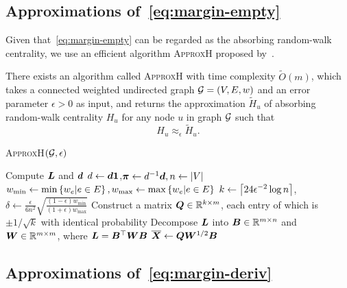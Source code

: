 \documentclass[sigconf]{acmart}
\begin{document}
\subsection{Approximations of~\eqref{eq:margin-empty}}\label{subsec:approx-margin-empty}

Given that~\eqref{eq:margin-empty} can be regarded as the absorbing random-walk centrality, we use an efficient algorithm \textsc{ApproxH} proposed by~\cite{ZhXuZh20}.
\begin{lemma}\label{lem:approxhk}
    There exists an algorithm called \textsc{ApproxH} with time complexity \(\tilde{O}(m)\), which takes a connected weighted undirected graph \(\mathcal{G}=(V,E,w)\) and an error parameter \(\epsilon>0\) as input, and returns the approximation \(\tilde{H}_u\) of absorbing random-walk centrality \(H_u\) for any node \(u\) in graph \(\mathcal{G}\) such that
    \[H_u\approx_\epsilon\tilde{H}_u.\]
\end{lemma}

\begin{algorithm}
    \caption{\textsc{ApproxH}\((\mathcal{G},\epsilon)\)}
    \label{algo:approxh}
    Compute \(\boldsymbol{L}\) and \(\boldsymbol{d}\)\;
    \(d\gets\boldsymbol{d}\boldsymbol{1}\),\(\boldsymbol{\pi}\gets d^{-1}\boldsymbol{d},n\gets\left|V \right|\)\;
    \(w_{\min}\gets\min\left\{w_e|e\in E \right\},w_{\max}\gets\max\left\{w_e|e\in E \right\}\)\;
    \(k\gets\left\lceil24\epsilon^{-2}\log n\right\rceil\),\(\delta\gets\frac{\epsilon}{6n^2}\sqrt{\frac{(1-\epsilon)w_{\min}}{(1+\epsilon)w_{\max}}}\)\;
    Construct a matrix \(\boldsymbol{Q}\in\mathbb{R}^{k\times m}\), each entry of which is \(\pm1/\sqrt k\) with identical probability\;
    Decompose \(\boldsymbol{L}\) into \(\boldsymbol{B}\in\mathbb{R}^{m\times n}\) and \(\boldsymbol{W}\in\mathbb{R}^{m\times m}\), where \(\boldsymbol{L}=\boldsymbol{B}^\top\boldsymbol{W}\boldsymbol{B}\)\;
    \(\overline{\boldsymbol{X}}\gets\boldsymbol{Q}\boldsymbol{W}^{1/2}\boldsymbol{B}\)\;

\end{algorithm}

\subsection{Approximations of~\eqref{eq:margin-deriv}}
\end{document}
